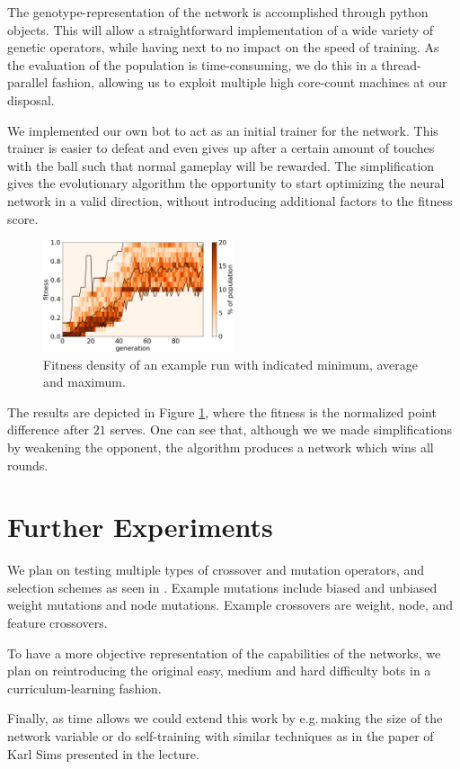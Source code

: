 \documentclass[11pt,a4paper]{scrartcl}
\begin{document}
The genotype-representation of the network is accomplished through python objects. This will allow a straightforward implementation of a wide variety of genetic operators, while having next to no impact on the speed of training.
As the evaluation of the population is time-consuming, we do this in a thread-parallel fashion, allowing us to exploit multiple high core-count machines at our disposal.

We implemented our own bot to act as an initial trainer for the network. This trainer is easier to defeat and even gives up after a certain amount of touches with the ball such that normal gameplay will be rewarded.
The simplification gives the evolutionary algorithm the opportunity to start optimizing the neural network in a valid direction, without introducing additional factors to the fitness score.

\begin{figure}[H]
\center
\includegraphics[width=0.5\textwidth]{img/fitness.png}
\caption{Fitness density of an example run with indicated minimum, average and maximum.}
\label{fig:train}
\end{figure}

The results are depicted in Figure \ref{fig:train}, where the fitness is the normalized point difference after $21$ serves.
One can see that, although we we made simplifications by weakening the opponent, the algorithm produces a network which wins all rounds.

\section*{Further Experiments}

We plan on testing multiple types of crossover and mutation operators, and selection schemes as seen in \cite{montana1989training}. Example mutations include biased and unbiased weight mutations and node mutations. Example crossovers are weight, node, and feature crossovers.

To have a more objective representation of the capabilities of the networks, we plan on reintroducing the original easy, medium and hard difficulty bots in a curriculum-learning fashion.

Finally, as time allows we could extend this work by e.g.\,making the size of the network variable or do self-training with similar techniques as in the paper of Karl Sims\cite{sims1994evolving} presented in the lecture.

{}

\end{document}

